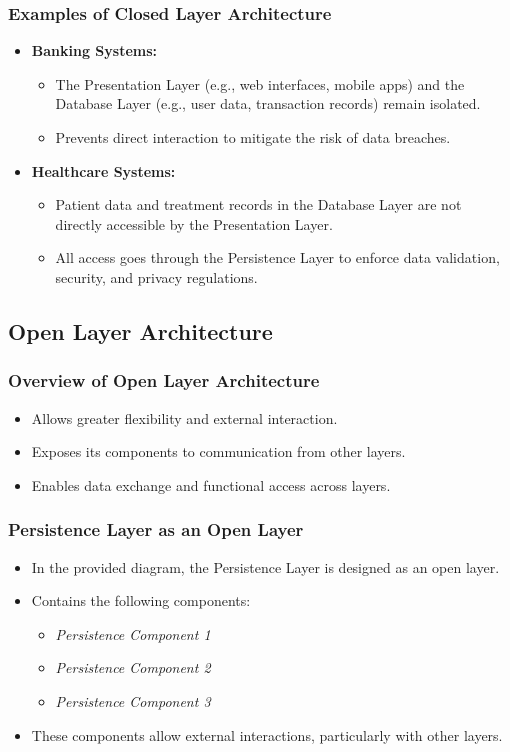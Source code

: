 \documentclass[aspectratio=169, table]{beamer}
\begin{document}
\begin{frame}
	\frametitle{Examples of Closed Layer Architecture}
	\begin{itemize}
		\item \textbf{Banking Systems:}
		\begin{itemize}
			\item The Presentation Layer (e.g., web interfaces, mobile apps) and the Database Layer (e.g., user data, transaction records) remain isolated.
			\item Prevents direct interaction to mitigate the risk of data breaches.
		\end{itemize}
		\item \textbf{Healthcare Systems:}
		\begin{itemize}
			\item Patient data and treatment records in the Database Layer are not directly accessible by the Presentation Layer.
			\item All access goes through the Persistence Layer to enforce data validation, security, and privacy regulations.
		\end{itemize}
	\end{itemize}
\end{frame}

\subsection{Open Layer Architecture}

\begin{frame}
	\frametitle{Overview of Open Layer Architecture}
	\begin{itemize}
		\item Allows greater flexibility and external interaction.
		\item Exposes its components to communication from other layers.
		\item Enables data exchange and functional access across layers.
	\end{itemize}
\end{frame}

\begin{frame}
	\frametitle{Persistence Layer as an Open Layer}
	\begin{itemize}
		\item In the provided diagram, the Persistence Layer is designed as an open layer.
		\item Contains the following components:
		\begin{itemize}
			\item \textit{Persistence Component 1}
			\item \textit{Persistence Component 2}
			\item \textit{Persistence Component 3}
		\end{itemize}
		\item These components allow external interactions, particularly with other layers.
	\end{itemize}
\end{frame}
\end{document}
